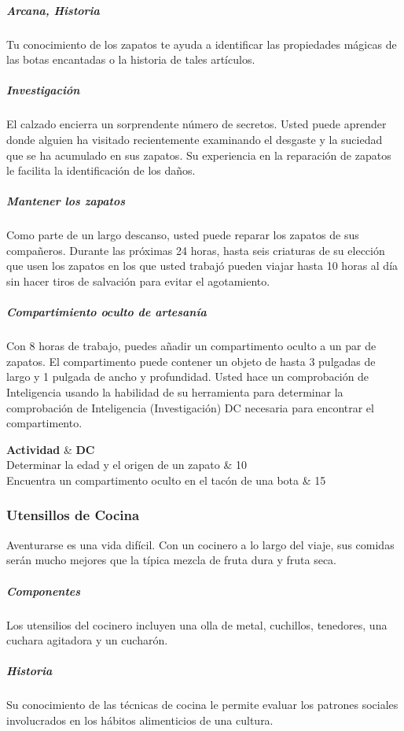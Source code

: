 \documentclass[a4paper,twocolumn,openany,10pt]{dndbook}
\begin{document}
\subparagraph{Arcana, Historia} Tu conocimiento de los zapatos te ayuda a identificar las propiedades mágicas de las botas
encantadas o la historia de tales artículos.

\subparagraph{Investigación} El calzado encierra un sorprendente número de secretos. Usted puede aprender donde alguien ha
visitado recientemente examinando el desgaste y la suciedad que se ha acumulado en sus zapatos. Su experiencia en la reparación de
zapatos le facilita la identificación de los daños.

\subparagraph{Mantener los zapatos} Como parte de un largo descanso, usted puede reparar los zapatos de sus compañeros. Durante
las próximas 24 horas, hasta seis criaturas de su elección que usen los zapatos en los que usted trabajó pueden viajar hasta 10
horas al día sin hacer tiros de salvación para evitar el agotamiento.

\subparagraph{Compartimiento oculto de artesanía} Con 8 horas de trabajo, puedes añadir un compartimento oculto a un par de
zapatos. El compartimento puede contener un objeto de hasta 3 pulgadas de largo y 1 pulgada de ancho y profundidad. Usted hace un
comprobación de Inteligencia usando la habilidad de su herramienta para determinar la comprobación de Inteligencia (Investigación)
DC necesaria para encontrar el compartimento. 

\begin{dndtable}[Xc]
	\textbf{Actividad}												& \textbf{DC}	\\
	Determinar la edad y el origen de un zapato					& 10	\\
	Encuentra un compartimento oculto en el tacón de una bota		& 15	\\
\end{dndtable}

\subsubsection*{Utensillos de Cocina}
Aventurarse es una vida difícil. Con un cocinero a lo largo del viaje, sus comidas serán mucho mejores que la típica mezcla de
fruta dura y fruta seca.

\subparagraph{Componentes} Los utensilios del cocinero incluyen una olla de metal, cuchillos, tenedores, una cuchara agitadora y
un cucharón.

\subparagraph{Historia} Su conocimiento de las técnicas de cocina le permite evaluar los patrones sociales involucrados en los
hábitos alimenticios de una cultura.
\end{document}
